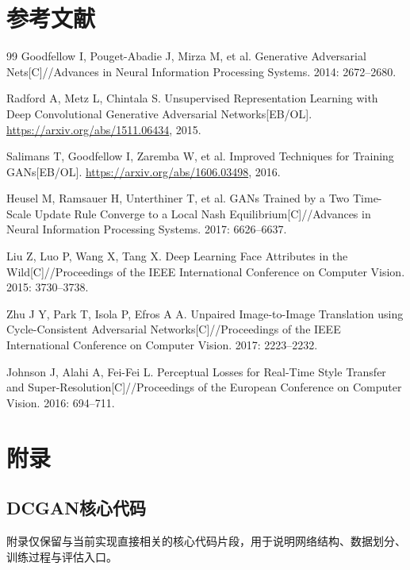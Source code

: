 \documentclass[12pt, a4paper, UTF8]{ctexart}
\begin{document}
\section{参考文献}
\begin{thebibliography}{99}
Goodfellow I, Pouget-Abadie J, Mirza M, et al.
Generative Adversarial Nets[C]//Advances in Neural Information Processing Systems.
2014: 2672--2680.

Radford A, Metz L, Chintala S.
Unsupervised Representation Learning with Deep Convolutional Generative Adversarial Networks[EB/OL].
\url{https://arxiv.org/abs/1511.06434}, 2015.

Salimans T, Goodfellow I, Zaremba W, et al.
Improved Techniques for Training GANs[EB/OL].
\url{https://arxiv.org/abs/1606.03498}, 2016.

Heusel M, Ramsauer H, Unterthiner T, et al.
GANs Trained by a Two Time-Scale Update Rule Converge to a Local Nash Equilibrium[C]//Advances in Neural Information Processing Systems.
2017: 6626--6637.

Liu Z, Luo P, Wang X, Tang X.
Deep Learning Face Attributes in the Wild[C]//Proceedings of the IEEE International Conference on Computer Vision.
2015: 3730--3738.

Zhu J Y, Park T, Isola P, Efros A A.
Unpaired Image-to-Image Translation using Cycle-Consistent Adversarial Networks[C]//Proceedings of the IEEE International Conference on Computer Vision.
2017: 2223--2232.

Johnson J, Alahi A, Fei-Fei L.
Perceptual Losses for Real-Time Style Transfer and Super-Resolution[C]//Proceedings of the European Conference on Computer Vision.
2016: 694--711.
\end{thebibliography}

\section{附录}
\subsection{DCGAN核心代码}

附录仅保留与当前实现直接相关的核心代码片段，用于说明网络结构、数据划分、训练过程与评估入口。


\end{document}
